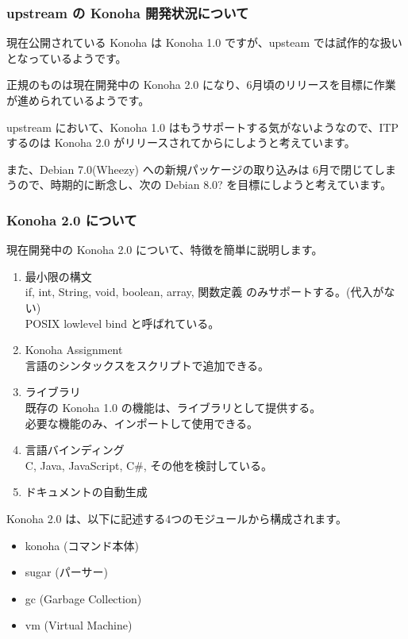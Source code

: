 \documentclass[mingoth,a4paper]{jsarticle}
\begin{document}
\subsubsection{upstream の Konoha 開発状況について}
現在公開されている Konoha は Konoha 1.0 ですが、upsteam では試作的な扱いとなっているようです。

正規のものは現在開発中の Konoha 2.0 になり、6月頃のリリースを目標に作業が進められているようです。

upstream において、Konoha 1.0 はもうサポートする気がないようなので、ITP するのは Konoha 2.0 がリリースされてからにしようと考えています。

また、Debian 7.0(Wheezy) への新規パッケージの取り込みは 6月で閉じてしまうので、時期的に断念し、次の Debian 8.0? を目標にしようと考えています。

\subsubsection{Konoha 2.0 について}
現在開発中の Konoha 2.0 について、特徴を簡単に説明します。

\begin{enumerate}
\item 最小限の構文\\
  if, int, String, void, boolean, array, 関数定義 のみサポートする。(代入がない)\\
  POSIX lowlevel bind と呼ばれている。
\item Konoha Assignment\\
  言語のシンタックスをスクリプトで追加できる。
\item ライブラリ\\
  既存の Konoha 1.0 の機能は、ライブラリとして提供する。\\
  必要な機能のみ、インポートして使用できる。
\item 言語バインディング\\
  C, Java, JavaScript, C\#, その他を検討している。
\item ドキュメントの自動生成
\end{enumerate}

Konoha 2.0 は、以下に記述する4つのモジュールから構成されます。
\begin{itemize}
\item konoha (コマンド本体)
\item sugar (パーサー)
\item gc (Garbage Collection)
\item vm (Virtual Machine)
\end{itemize}
\end{document}
